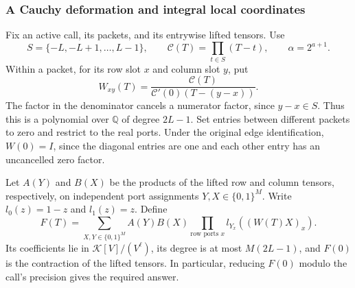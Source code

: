 \subsubsection{A Cauchy deformation and integral local coordinates}
\label{subsec:tensor-deformation}

Fix an active call, its packets, and its entrywise lifted tensors.
Use
\[
 S=\{-L,-L+1,\ldots,L-1\},\qquad
 \mathcal C(T)=\prod_{t\in S}(T-t),\qquad \alpha=2^{a+1}.
\]
Within a packet, for its row slot $x$ and column slot $y$, put
\begin{equation}\label{eq:tensor-cauchy}
 W_{xy}(T)=\frac{\mathcal C(T)}
                  {\mathcal C'(0)(T-(y-x))}.
\end{equation}
The factor in the denominator cancels a numerator factor, since
$y-x\in S$.  Thus this is a polynomial over $\mathbb Q$ of degree
$2L-1$.  Set entries between different packets to zero and restrict
to the real ports.  Under the original edge identification,
$W(0)=I$, since the diagonal entries are one and each other entry has
an uncancelled zero factor.

Let $A(Y)$ and $B(X)$ be the products of the lifted row and column
tensors, respectively, on independent port assignments
$Y,X\in\{0,1\}^M$.  Write $l_0(z)=1-z$ and $l_1(z)=z$.  Define
\begin{equation}\label{eq:tensor-deformed-contraction}
 F(T)=\sum_{X,Y\in\{0,1\}^M} A(Y)B(X)
                  \prod_{\text{row ports }x}l_{Y_x}((W(T)X)_x).
\end{equation}
Its coefficients lie in $\mathcal K[V]/(V^\ell)$, its degree is at
most $M(2L-1)$, and $F(0)$ is the contraction of the lifted tensors.
In particular, reducing $F(0)$ modulo the call's precision gives
the required answer.

